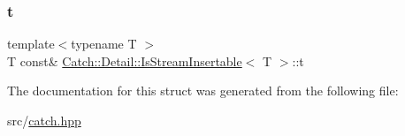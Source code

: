 \mbox{\label{struct_catch_1_1_detail_1_1_is_stream_insertable_a7d2a3da978b6736667a7b2f6d51f507f}} 
\subsubsection{\texorpdfstring{t}{t}}
{\footnotesize\ttfamily template$<$typename T $>$ \\
T const\& \hyperlink{struct_catch_1_1_detail_1_1_is_stream_insertable}{Catch\+::\+Detail\+::\+Is\+Stream\+Insertable}$<$ T $>$\+::t\hspace{0.3cm}{\ttfamily [static]}}



The documentation for this struct was generated from the following file\+:\begin{DoxyCompactItemize}
\item 
src/\hyperlink{catch_8hpp}{catch.\+hpp}\end{DoxyCompactItemize}

